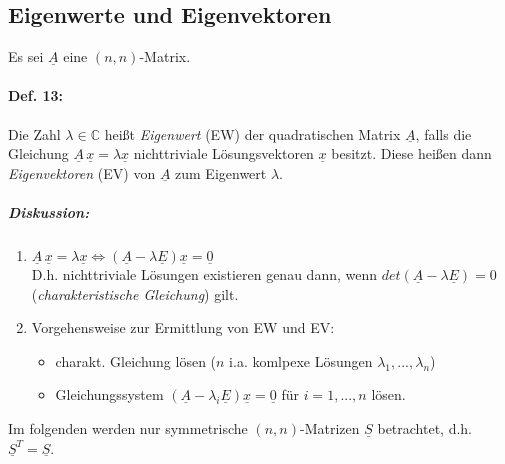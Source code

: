 \subsection{Eigenwerte und Eigenvektoren}
Es sei $\underline{A}$ eine $(n,n)$-Matrix.
\paragraph{Def. 13:} \parskp
Die Zahl $\lambda \in \mathbb{C}$ heißt \emph{Eigenwert} (EW) der quadratischen Matrix $\underline{A}$, falls die Gleichung $\boxed{\underline{A}\,\underline{x}=\lambda \underline{x}}$ nichttriviale Lösungsvektoren $\underline{x}$ besitzt. Diese heißen dann \emph{Eigenvektoren} (EV) von $\underline{A}$ zum Eigenwert $\lambda$.
\subparagraph{Diskussion:}
\begin{enumerate}
\item $\underline{A}\,\underline{x} = \lambda \underline{x} \Leftrightarrow (\underline{A}-\lambda\underline{E})\underline{x}=\underline{0}$\\
D.h. nichttriviale Lösungen existieren genau dann, wenn $\boxed{det(\underline{A}-\lambda\underline{E})=0}$ (\emph{charakteristische Gleichung}) gilt.
\item Vorgehensweise zur Ermittlung von EW und EV:\\
\begin{itemize}
\item charakt. Gleichung lösen ($n$ i.a. komlpexe Lösungen $\lambda_1, ..., \lambda_n$)
\item Gleichungssystem $(\underline{A}-\lambda_i\underline{E})\underline{x}=\underline{0}$ für $i=1,...,n$ lösen.
\end{itemize}
\end{enumerate}
Im folgenden werden nur symmetrische $(n,n)$-Matrizen $\underline{S}$ betrachtet, d.h. $\underline{S}^T=\underline{S}$.
